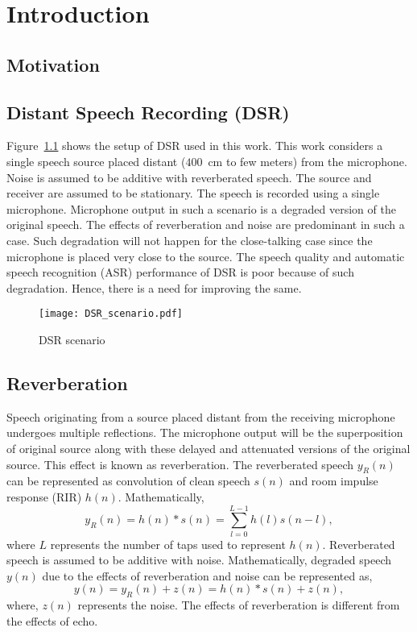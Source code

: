 
\chapter{Introduction}

\section{Motivation}


\section{Distant Speech Recording (DSR)}
Figure~\ref{fig:DSR_scenario} shows the setup of DSR used in this work. This work considers a single speech source placed distant ($400$~cm to few meters) from the microphone. Noise is assumed to be additive with reverberated speech. The source and receiver are assumed to be stationary. The speech is recorded using a single microphone. Microphone output in such a scenario is a degraded version of the original speech. The effects of reverberation and noise are predominant in such a case. Such degradation will not happen for the close-talking case since the microphone is placed very close to the source. The speech quality and automatic speech recognition (ASR) performance of DSR is poor because of such degradation. Hence, there is a need for improving the same. 
\iffalse
\begin{itemize}
\item Why use DSR ?
\item Difference between close-talking and DSR
\item Effect on speech quality and ASR in DSR
\end{itemize}
\fi
\begin{figure}
\centering
\texttt{[image: DSR\_scenario.pdf]}
\caption{DSR scenario}
\label{fig:DSR_scenario}
\end{figure}

\section{Reverberation}
Speech originating from a source placed distant from the receiving microphone undergoes multiple reflections. The microphone output will be the superposition of original source along with these delayed and attenuated versions of the original source. This effect is known as reverberation. The reverberated speech $y_R(n)$ can be represented as convolution of clean speech $s(n)$ and room impulse response (RIR) $h(n)$. Mathematically,
\begin{equation}
y_R(n)=h(n)*s(n) = \sum_{l=0}^{L-1}h(l)s(n-l),
\end{equation}
where $L$ represents the number of taps used to represent $h(n)$. Reverberated speech is assumed to be additive with noise. Mathematically, degraded speech $y(n)$ due to the effects of reverberation and noise can be represented as,
\begin{equation}
y(n)=y_R(n)+z(n)=h(n)*s(n)+z(n),
\end{equation}
where, $z(n)$ represents the noise. The effects of reverberation is different from the effects of echo.

